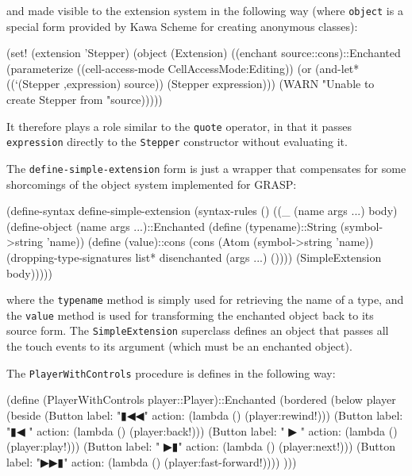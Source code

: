 \documentclass[acmsmall]{acmart}
\newenvironment{Snippet}{\Verbatim[samepage=true]}{\endVerbatim}
\begin{document}
and made visible to the extension system in the following way (where
\texttt{object} is a special form provided by Kawa Scheme for creating
anonymous classes):

\begin{Snippet}
(set! (extension 'Stepper)
      (object (Extension)
	((enchant source::cons)::Enchanted
	 (parameterize ((cell-access-mode CellAccessMode:Editing))
	   (or (and-let* ((`(Stepper ,expression) source))
		 (Stepper expression)))
	     (WARN "Unable to create Stepper from "source)))))
\end{Snippet}

It therefore plays a role similar to the \texttt{quote} operator, in that
it passes \texttt{expression} directly to the \texttt{Stepper} constructor
without evaluating it.

The \texttt{define-simple-extension} form is just a wrapper that compensates
for some shorcomings of the object system implemented for GRASP:

\begin{Snippet}
(define-syntax define-simple-extension
  (syntax-rules ()
    ((_ (name args ...) body)
     (define-object (name args ...)::Enchanted 
       (define (typename)::String
	 (symbol->string 'name))
\end{Snippet}
\begin{Snippet}
       (define (value)::cons
	 (cons (Atom (symbol->string 'name))
	       (dropping-type-signatures list*
					 disenchanted
					 (args ...)
					 ())))
       (SimpleExtension body)))))
\end{Snippet}

where the \texttt{typename} method is simply used for retrieving the name
of a type, and the \texttt{value} method is used for transforming the enchanted
object back to its source form. The \texttt{SimpleExtension} superclass
defines an object that passes all the touch events to its argument
(which must be an enchanted object).

The \texttt{PlayerWithControls} procedure is defines in the following way:

\begin{Snippet}
(define (PlayerWithControls player::Player)::Enchanted
  (bordered
   (below
    player
    (beside
      (Button label: "▮◀◀" action: (lambda () (player:rewind!)))
      (Button label: "▮◀ " action: (lambda () (player:back!)))
      (Button label: " ▶ " action: (lambda () (player:play!)))
      (Button label: " ▶▮" action: (lambda () (player:next!)))
      (Button label: "▶▶▮" action: (lambda () (player:fast-forward!))))
    )))
\end{Snippet}
\end{document}
